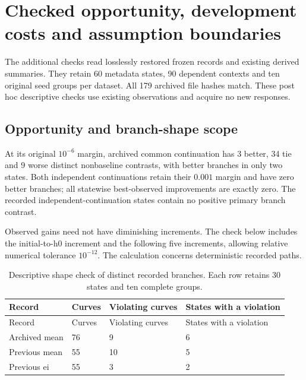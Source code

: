 \section{Checked opportunity, development costs and assumption boundaries}\label{supp:checked_records}

The additional checks read losslessly restored frozen records and existing derived summaries. They retain 60 metadata states, 90 dependent contexts and ten original seed groups per dataset. All 179 archived file hashes match. These post hoc descriptive checks use existing observations and acquire no new responses.

\subsection{Opportunity and branch-shape scope}
At its original $10^{-6}$ margin, archived common continuation has 3 better, 34 tie and 9 worse distinct nonbaseline contrasts, with better branches in only two states. Both independent continuations retain their $0.001$ margin and have zero better branches; all statewise best-observed improvements are exactly zero. The recorded independent-continuation states contain no positive primary branch contrast.

Observed gains need not have diminishing increments. The check below includes the initial-to-h0 increment and the following five increments, allowing relative numerical tolerance $10^{-12}$. The calculation concerns deterministic recorded paths.

\FloatBarrier\begingroup\fontsize{8.5}{10.5}\selectfont\setlength\tabcolsep{3pt}
\begin{longtable}{@{}p{.34\linewidth}p{.18\linewidth}p{.20\linewidth}p{}@{}}
\caption{Descriptive shape check of distinct recorded branches. Each row retains 30 states and ten complete groups.}\label{tab:shape_screen}\\
\toprule Record & Curves & Violating curves & States with a violation \\
\midrule\endfirsthead\toprule Record & Curves & Violating curves & States with a violation \\
\midrule\endhead\bottomrule\endlastfoot
Archived mean & 76 & 9 & 6 \\
Previous mean & 55 & 10 & 5 \\
Previous ei & 55 & 3 & 2 \\
\end{longtable}\endgroup

